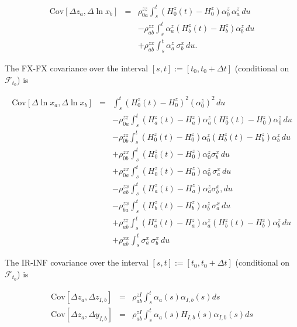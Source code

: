 \documentclass[12pt, a4paper]{article}
\begin{document}
{\begin{appendix}
\begin{eqnarray*}
      \mathrm{Cov} [\Delta z_a, \Delta \ln x_b] &=& \rho^{zz}_{0a}\int_s^t \left(H^z_0(t)-H^z_0\right)
  \alpha^z_0\,\alpha^z_a\,du \nonumber\\
      &&- \rho^{zz}_{ab}\int_s^t \alpha^z_a \left(H^z_b(t)-H^z_b\right) \alpha^z_b \,du \nonumber\\
      &&+\rho^{zx}_{ab}\int_s^t \alpha^z_a \, \sigma^x_b \,du.
\end{eqnarray*}

The FX-FX covariance over the interval $[s,t] := [t_0, t_0+\Delta t]$ (conditional on $\mathcal{F}_{t_0}$) is

\begin{eqnarray*}
      \mathrm{Cov}[\Delta \ln x_a, \Delta \ln x_b] &=&
      \int_s^t \left(H^z_0(t)-H^z_0\right)^2 (\alpha_0^z)^2\,du \nonumber\\
      && -\rho^{zz}_{0a} \int_s^t \left(H^z_a(t)-H^z_a\right) \alpha_a^z\left(H^z_0(t)-H^z_0\right) \alpha_0^z\,du
  \nonumber\\
      &&- \rho^{zz}_{0b}\int_s^t \left(H^z_0(t)-H^z_0\right)\alpha_0^z \left(H^z_b(t)-H^z_b\right)\alpha_b^z\,du
  \nonumber\\
      &&+ \rho^{zx}_{0b}\int_s^t \left(H^z_0(t)-H^z_0\right)\alpha_0^z \sigma^x_b\,du \nonumber\\
      &&+ \rho^{zx}_{0a}\int_s^t \left(H^z_0(t)-H^z_0\right)\alpha_0^z\,\sigma^x_a\,du \nonumber\\
      &&- \rho^{zx}_{ab}\int_s^t \left(H^z_a(t)-H^z_a\right)\alpha_a^z \sigma^x_b,du\nonumber\\
      &&- \rho^{zx}_{ba}\int_s^t \left(H^z_b(t)-H^z_b\right)\alpha_b^z\,\sigma^x_a\, du \nonumber\\
      &&+ \rho^{zz}_{ab}\int_s^t \left(H^z_a(t)-H^z_a\right)\alpha_a^z \left(H^z_b(t)-H^z_b\right)\alpha_b^z\,du
  \nonumber\\
      &&+ \rho^{xx}_{ab}\int_s^t\sigma^x_a\,\sigma^x_b \,du
\end{eqnarray*}

The IR-INF covariance over the interval $[s,t] := [t_0, t_0+\Delta t]$ (conditional on $\mathcal{F}_{t_0}$) is

\begin{eqnarray*}
  \mathrm{Cov}[ \Delta z_a, \Delta z_{I,b} ] & = & \rho_{ab}^{zI} \int_s^t \alpha_a(s) \alpha_{I,b}(s) ds \\
  \mathrm{Cov}[ \Delta z_a, \Delta y_{I,b} ] & = & \rho_{ab}^{zI} \int_s^t \alpha_a(s) H_{I,b}(s) \alpha_{I,b}(s) ds
\end{eqnarray*}


\end{appendix}}
\end{document}
